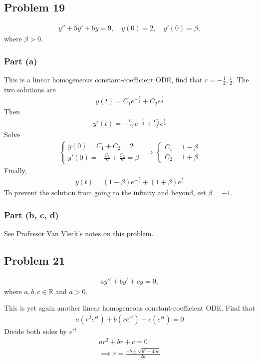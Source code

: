 \documentclass[12pt]{article}
\begin{document}
\subsection*{Problem 19}
\label{sec:org9baa051}
\begin{align*}
  y'' + 5y' + 6y = 9, \quad y(0) = 2, \quad y'(0) = \beta,
\end{align*}
where \(\beta > 0\).
\subsubsection*{Part (a)}
\label{sec:orga8aa226}
This is a linear homogeneous constant-coefficient ODE, find that
\(r = {-\frac{1}{2}, \frac{1}{2}}\). The two solutions are
\begin{align*}
  y(t) = C_1 e^{-\frac{t}{2}} + C_2 e^{\frac{t}{2}}
\end{align*}
Then
\begin{align*}
  y'(t) = -\frac{C_1}{2} e^{-\frac{t}{2}} + \frac{C_2}{2} e^{\frac{t}{2}}
\end{align*}
Solve
\begin{align*}
  \begin{cases}
    y(0) = C_1 + C_2 = 2\\
    y'(0) = -\frac{C_1}{2} + \frac{C_2}{2} = \beta
  \end{cases} \implies
  \begin{cases}
    C_1 = 1 - \beta\\
    C_2 = 1 + \beta
  \end{cases}
\end{align*}
Finally,
\begin{align*}
  y(t) = (1 - \beta)e^{-\frac{t}{2}} + (1+\beta)e^{\frac{t}{2}}
\end{align*}
To prevent the solution from going to the infinity and beyond, set
\(\beta=-1\).
\subsubsection*{Part (b, c, d)}
\label{sec:orge9bfae0}
See Professor Van Vleck's notes on this problem.
\subsection*{Problem 21}
\label{sec:org9f864be}
\begin{align*}
  ay'' + by' + cy = 0,
\end{align*}
where \(a, b, c \in \mathbb{R}\) and \(a > 0\).

This is yet again another linear homogeneous constant-coefficient ODE. Find
that
  \begin{align*}
a\left(r^{2} e^{r t}\right)+b\left(r e^{r t}\right)+c\left(e^{r t}\right)=0
\end{align*}
Divide both sides by \(e^{r t}\)
\begin{align*}
a r^{2}+b r+c=0 \\
\implies r=\frac{-b \pm \sqrt{b^{2}-4 a c}}{2 a}
\end{align*}
\end{document}
